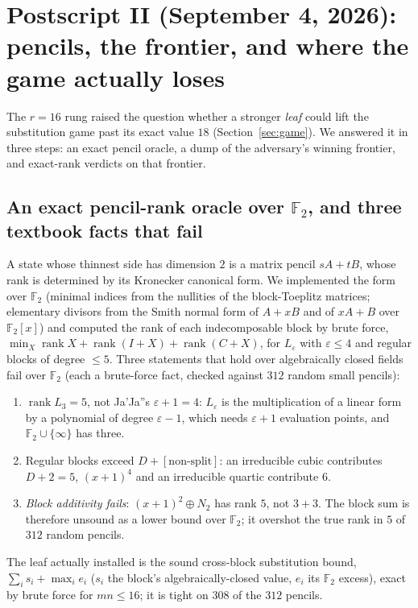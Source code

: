 \documentclass[11pt]{article}
\theoremstyle{definition}
\newcommand{\F}{\mathbb{F}_2}
\newcommand{\rk}{\operatorname{rank}}
\begin{document}
\section{Postscript II (September 4, 2026): pencils, the frontier, and where the
game actually loses}
\label{sec:postscript2}

The $r=16$ rung raised the question whether a stronger \emph{leaf} could
lift the substitution game past its exact value $18$ (Section~\ref{sec:game}).
We answered it in three steps: an exact pencil oracle, a dump of the
adversary's winning frontier, and exact-rank verdicts on that frontier.

\subsection{An exact pencil-rank oracle over $\F$, and three textbook facts
that fail}

A state whose thinnest side has dimension $2$ is a matrix pencil $sA+tB$,
whose rank is determined by its Kronecker canonical form. We implemented the
form over $\F$ (minimal indices from the nullities of the block-Toeplitz
matrices; elementary divisors from the Smith normal form of $A+xB$ and of
$xA+B$ over $\F[x]$) and computed the rank of each indecomposable block by
brute force, $\min_X \rk X + \rk(I{+}X) + \rk(C{+}X)$, for $L_\varepsilon$
with $\varepsilon\le 4$ and regular blocks of degree $\le 5$. Three
statements that hold over algebraically closed fields fail over $\F$
(each a brute-force fact, checked against $312$ random small pencils):
\begin{enumerate}
\item $\rk L_3 = 5$, not Ja'Ja''s $\varepsilon+1 = 4$: $L_\varepsilon$ is the
multiplication of a linear form by a polynomial of degree $\varepsilon-1$,
which needs $\varepsilon+1$ evaluation points, and $\F\cup\{\infty\}$ has
three.
\item Regular blocks exceed $D + [\text{non-split}]$: an irreducible cubic
contributes $D+2 = 5$, $(x+1)^4$ and an irreducible quartic contribute $6$.
\item \emph{Block additivity fails}: $(x+1)^2 \oplus N_2$ has rank $5$,
not $3+3$. The block sum is therefore unsound as a lower bound over $\F$;
it overshot the true rank in $5$ of $312$ random pencils.
\end{enumerate}
The leaf actually installed is the sound cross-block substitution bound,
$\sum_i s_i + \max_i e_i$ ($s_i$ the block's algebraically-closed value,
$e_i$ its $\F$ excess), exact by brute force for $mn \le 16$; it is tight on
$308$ of the $312$ pencils.
\end{document}
